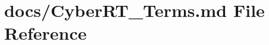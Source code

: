 \hypertarget{CyberRT__Terms_8md}{\section{docs/\-Cyber\-R\-T\-\_\-\-Terms.md File Reference}
\label{CyberRT__Terms_8md}
}
